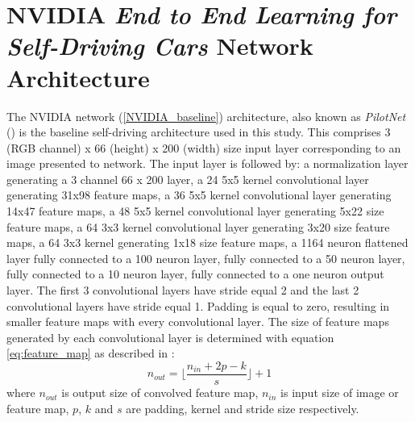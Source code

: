 \section{NVIDIA \textit{End to End Learning for Self-Driving Cars} Network Architecture}

The NVIDIA network (\ref{NVIDIA_baseline}) architecture, also known as \textit{PilotNet} (\cite{bojarski2020nvidia}) is the baseline self-driving architecture used in this study. This comprises 3 (RGB channel) x 66 (height) x 200 (width) size input layer corresponding to an image presented to network. The input layer is followed by: a normalization layer generating a 3 channel 66 x 200 layer, a 24 5x5 kernel convolutional layer generating 31x98 feature maps, a 36 5x5 kernel convolutional layer generating 14x47 feature maps, a 48 5x5 kernel convolutional layer generating 5x22 size feature maps, a 64 3x3 kernel convolutional layer generating 3x20 size feature maps, a 64 3x3 kernel generating 1x18 size feature maps, a 1164 neuron flattened layer fully connected to a 100 neuron layer, fully connected to a 50 neuron layer, fully connected to a 10 neuron layer, fully connected to a one neuron output layer.  
The first 3 convolutional layers have stride equal 2 and the last 2 convolutional layers have stride equal 1. Padding is equal to zero, resulting in smaller feature maps with every convolutional layer.
The size of feature maps generated by each convolutional layer is determined with equation \ref{eq:feature_map} as described in \cite{dumoulin2018guide}:
\begin{equation}
    \label{eq:feature_map}
    n_{out}= \Big\lfloor\frac{n_{in} + 2p -k}{s} \Big\rfloor +1
\end{equation}
where $n_{out}$ is output size of convolved feature map, $n_{in}$ is input size of image or feature map, $p$, $k$ and $s$ are padding, kernel and stride size respectively.  
 
